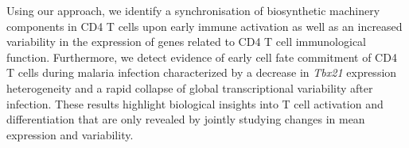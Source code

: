 Using our approach, we identify a synchronisation of  biosynthetic machinery components in CD4\plus{} T cells upon early immune activation as well as an increased variability in the expression of genes related to CD4\plus{} T cell immunological function.
Furthermore, we detect evidence of early cell fate commitment of CD4\plus{} T cells during malaria infection characterized by a decrease in \textit{Tbx21} expression heterogeneity and a rapid collapse of global transcriptional variability after infection. These results highlight biological insights into T cell activation and differentiation that are only revealed by jointly studying changes in mean expression and variability.
